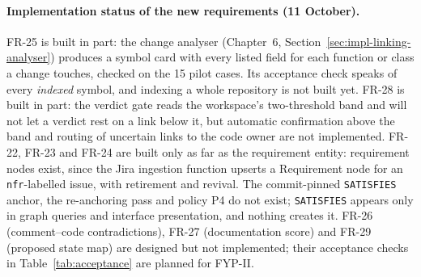 \paragraph{Implementation status of the new requirements (11 October).}
FR-25 is built in part: the change analyser (Chapter~6,
Section~\ref{sec:impl-linking-analyser}) produces a symbol card with every
listed field for each function or class a change touches, checked on the 15
pilot cases. Its acceptance check speaks of every \emph{indexed} symbol, and
indexing a whole repository is not built yet. FR-28 is built in part: the
verdict gate reads the workspace's two-threshold band and will not let a
verdict rest on a link below it, but automatic confirmation above the band and
routing of uncertain links to the code owner are not implemented. FR-22,
FR-23 and FR-24 are built only as far as the requirement entity: requirement
nodes exist, since the Jira ingestion function upserts a Requirement node for an
\texttt{nfr}-labelled issue, with retirement and revival. The commit-pinned
\texttt{SATISFIES} anchor, the re-anchoring pass and policy P4 do not exist;
\texttt{SATISFIES} appears only in graph queries and interface presentation, and
nothing creates it. FR-26 (comment--code contradictions), FR-27 (documentation
score) and FR-29 (proposed state map) are designed but not implemented; their
acceptance checks in Table~\ref{tab:acceptance} are planned for FYP-II.

